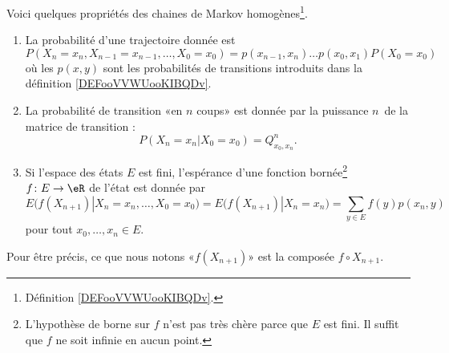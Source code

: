\begin{proposition}     \label{PROPooYIDWooAKTVvS}
	Voici quelques propriétés des chaines de Markov homogènes\footnote{Définition \ref{DEFooVVWUooKIBQDv}.}.
	\begin{enumerate}
		\item       \label{ITEMooSDDUooVRnpjv}
		      La probabilité d'une trajectoire donnée est
		      \begin{equation}
			      P(X_n=x_n,X_{n-1}=x_{n-1},\ldots,X_0=x_0)=p(x_{n-1},x_n)\dots p(x_0,x_1)P(X_0=x_0)
		      \end{equation}
		      où les \( p(x,y)\) sont les probabilités de transitions introduits dans la définition \ref{DEFooVVWUooKIBQDv}.
		\item       \label{ITEMooJZNRooXFQTQc}
		      La probabilité de transition «en \( n\) coups» est donnée par la puissance \( n\)\ieme\ de la matrice de transition :
		      \begin{equation}
			      P(X_n=x_n|X_0=x_0)=Q^n_{x_0,x_n}.
		      \end{equation}
		\item       \label{ITEMooJUEMooWXEkBO}
		      Si l'espace des états \( E\) est fini, l'espérance d'une fonction bornée\footnote{L'hypothèse de borne sur \( f\) n'est pas très chère parce que \( E\) est fini. Il suffit que \( f\) ne soit infinie en aucun point.} \( f\colon E\to \eR\) de l'état est donnée par
		      \begin{equation}
			      E\big( f(X_{n+1})|X_n=x_n,\ldots,X_0=x_0 \big)=E\big( f(X_{n+1})|X_n=x_n \big)
			      =\sum_{y\in E}f(y)p(x_n,y)
		      \end{equation}
		      pour tout \( x_0,\ldots, x_n\in E\).
	\end{enumerate}
	Pour être précis, ce que nous notons «\( f(X_{n+1})\)» est la composée \( f\circ X_{n+1}\).
\end{proposition}

